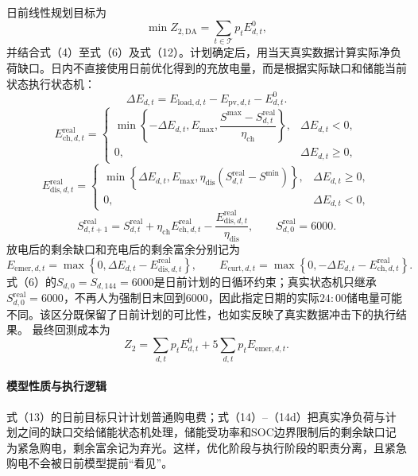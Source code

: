 \documentclass{cumcmthesis}
\newcommand{\Tset}{\mathcal{T}}
\begin{document}
日前线性规划目标为
\begin{equation}
\min Z_{2,\mathrm{DA}}=\sum_{t\in\Tset}p_tE^0_{d,t},
\tag{13}
\end{equation}
并结合式（4）至式（6）及式（12）。计划确定后，用当天真实数据计算实际净负荷缺口。日内不直接使用日前优化得到的充放电量，而是根据实际缺口和储能当前状态执行状态机：
\begin{equation}
\Delta E_{d,t}=E_{\mathrm{load},d,t}-E_{\mathrm{pv},d,t}-E^0_{d,t}.
\tag{14}
\end{equation}
\begin{equation}
E_{\mathrm{ch},d,t}^{\mathrm{real}}=
\begin{cases}
\min\left\{-\Delta E_{d,t},E_{\max},
\dfrac{S^{\max}-S_{d,t}^{\mathrm{real}}}{\eta_{\mathrm{ch}}}\right\},&\Delta E_{d,t}<0,\\
0,&\Delta E_{d,t}\geq0,
\end{cases}
\tag{14a}
\end{equation}
\begin{equation}
E_{\mathrm{dis},d,t}^{\mathrm{real}}=
\begin{cases}
\min\left\{\Delta E_{d,t},E_{\max},
\eta_{\mathrm{dis}}(S_{d,t}^{\mathrm{real}}-S^{\min})\right\},&\Delta E_{d,t}\geq0,\\
0,&\Delta E_{d,t}<0,
\end{cases}
\tag{14b}
\end{equation}
\begin{equation}
S_{d,t+1}^{\mathrm{real}}=S_{d,t}^{\mathrm{real}}+\eta_{\mathrm{ch}}E_{\mathrm{ch},d,t}^{\mathrm{real}}
-\frac{E_{\mathrm{dis},d,t}^{\mathrm{real}}}{\eta_{\mathrm{dis}}},\qquad S_{d,0}^{\mathrm{real}}=6000.
\tag{14c}
\end{equation}
放电后的剩余缺口和充电后的剩余富余分别记为
\begin{equation}
E_{\mathrm{emer},d,t}=\max\left\{0,\Delta E_{d,t}-E_{\mathrm{dis},d,t}^{\mathrm{real}}\right\},\qquad
E_{\mathrm{curt},d,t}=\max\left\{0,-\Delta E_{d,t}-E_{\mathrm{ch},d,t}^{\mathrm{real}}\right\}.
\tag{14d}
\end{equation}
式（6）的$S_{d,0}=S_{d,144}=6000$是日前计划的日循环约束；真实状态机只继承$S_{d,0}^{\mathrm{real}}=6000$，不再人为强制日末回到6000，因此指定日期的实际$24{:}00$储电量可能不同。该区分既保留了日前计划的可比性，也如实反映了真实数据冲击下的执行结果。
最终回测成本为
\begin{equation}
Z_2=\sum_{d,t}p_tE^0_{d,t}+5\sum_{d,t}p_tE_{\mathrm{emer},d,t}.
\tag{15}
\end{equation}
\paragraph{模型性质与执行逻辑}
式（13）的日前目标只计计划普通购电费；式（14）--（14d）把真实净负荷与计划之间的缺口交给储能状态机处理，储能受功率和SOC边界限制后的剩余缺口记为紧急购电，剩余富余记为弃光。这样，优化阶段与执行阶段的职责分离，且紧急购电不会被日前模型提前“看见”。
\end{document}
